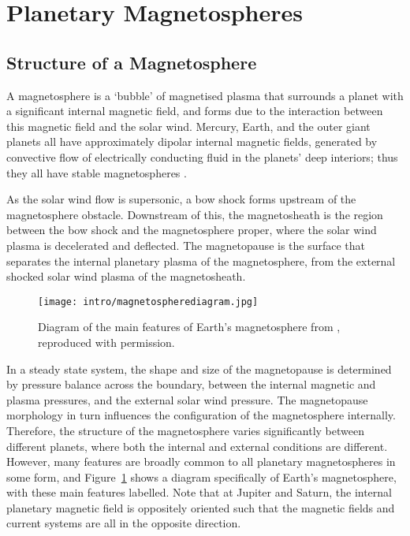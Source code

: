 \section{Planetary Magnetospheres}
\subsection{Structure of a Magnetosphere}
A magnetosphere is a `bubble' of magnetised plasma that surrounds a planet with a significant internal magnetic field, and forms due to the interaction between this magnetic field and the solar wind. Mercury, Earth, and the outer giant planets all have approximately dipolar internal magnetic fields, generated by convective flow of electrically conducting fluid in the planets' deep interiors; thus they all have stable magnetospheres \citep{kivelson2014book}.

As the solar wind flow is supersonic, a bow shock forms upstream of the magnetosphere obstacle. Downstream of this, the magnetosheath is the region between the bow shock and the magnetosphere proper, where the solar wind plasma is decelerated and deflected. The magnetopause is the surface that separates the internal planetary plasma of the magnetosphere, from the external shocked solar wind plasma of the magnetosheath. 

\begin{figure}
\centering
\noindent\texttt{[image: intro/magnetospherediagram.jpg]}
\caption[Diagram of Earth's magnetosphere.]{Diagram of the main features of Earth's magnetosphere from \citet{russell2016}, reproduced with permission.}
\label{intro:fig:magnetosphere}
\end{figure}

In a steady state system, the shape and size of the magnetopause is determined by pressure balance across the boundary, between the internal magnetic and plasma pressures, and the external solar wind pressure. The magnetopause morphology in turn influences the configuration of the magnetosphere internally. Therefore, the structure of the magnetosphere varies significantly between different planets, where both the internal and external conditions are different. However, many features are broadly common to all planetary magnetospheres in some form, and Figure~\ref{intro:fig:magnetosphere} shows a diagram specifically of Earth's magnetosphere, with these main features labelled. Note that at Jupiter and Saturn, the internal planetary magnetic field is oppositely oriented such that the magnetic fields and current systems are all in the opposite direction.

